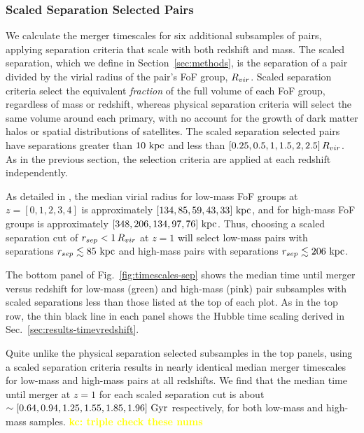 \documentclass[twocolumn,linenumbers]{aastex631}
\newcommand{\kc}[1]{\textcolor{yellow}{\textbf{kc: #1}} }
\newcommand{\chambe}{\citet{Chamberlain2024}}
\begin{document}
    \subsubsection{Scaled Separation Selected Pairs}
    \label{sec:results-scal}
        We calculate the merger timescales for six additional subsamples of pairs, applying separation criteria that scale with both redshift and mass.
        The scaled separation, which we define in Section~\ref{sec:methods}, is the separation of a pair divided by the virial radius of the pair's FoF group, $R_{vir}$. 
        Scaled separation criteria select the equivalent \textit{fraction} of the full volume of each FoF group, regardless of mass or redshift, whereas physical separation criteria will select the same volume around each primary, with no account for the growth of dark matter halos or spatial distributions of satellites. 
        The scaled separation selected pairs have separations greater than $10\,\mathrm{\,kpc}$ and less than $[0.25, 0.5, 1, 1.5, 2, 2.5]\,R_{vir}$. 
        As in the previous section, the selection criteria are applied at each redshift independently. 
        
        As detailed in \chambe{}, the median virial radius for low-mass FoF groups at $z=[0,1,2,3,4]$ is approximately $[134, 85, 59, 43, 33]\,\mathrm{\,kpc}$, and for high-mass FoF groups is approximately $[348, 206, 134, 97, 76]\,\mathrm{\,kpc}$.
        Thus, choosing a scaled separation cut of $r_{sep}<1\,R_{vir}$ at $z=1$ will select low-mass pairs with separations $r_{sep}\lesssim85\,\mathrm{\,kpc}$ and high-mass pairs with separations $r_{sep}\lesssim206\,\mathrm{\,kpc}$.
        
        The bottom panel of Fig.~\ref{fig:timescales-sep} shows the median time until merger versus redshift for low-mass (green) and high-mass (pink) pair subsamples with scaled separations less than those listed at the top of each plot. 
        As in the top row, the thin black line in each panel shows the Hubble time scaling derived in Sec.~\ref{sec:results-timevredshift}.
        
        Quite unlike the physical separation selected subsamples in the top panels, using a scaled separation criteria results in nearly identical median merger timescales for low-mass and high-mass pairs at all redshifts.
        We find that the median time until merger at $z=1$ for each scaled separation cut is about $\sim[0.64, 0.94,1.25,1.55,1.85,1.96]\,\mathrm{\,Gyr}$  respectively, for both low-mass and high-mass samples. \kc{triple check these nums}
        
\end{document}
